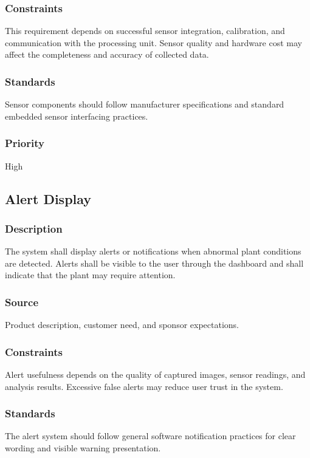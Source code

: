 \subsubsection{Constraints}
This requirement depends on successful sensor integration, calibration, and communication with the processing unit. Sensor quality and hardware cost may affect the completeness and accuracy of collected data.

\subsubsection{Standards}
Sensor components should follow manufacturer specifications and standard embedded sensor interfacing practices.

\subsubsection{Priority}
High

\subsection{Alert Display}
\subsubsection{Description}
The system shall display alerts or notifications when abnormal plant conditions are detected. Alerts shall be visible to the user through the dashboard and shall indicate that the plant may require attention.

\subsubsection{Source}
Product description, customer need, and sponsor expectations.

\subsubsection{Constraints}
Alert usefulness depends on the quality of captured images, sensor readings, and analysis results. Excessive false alerts may reduce user trust in the system.

\subsubsection{Standards}
The alert system should follow general software notification practices for clear wording and visible warning presentation.

